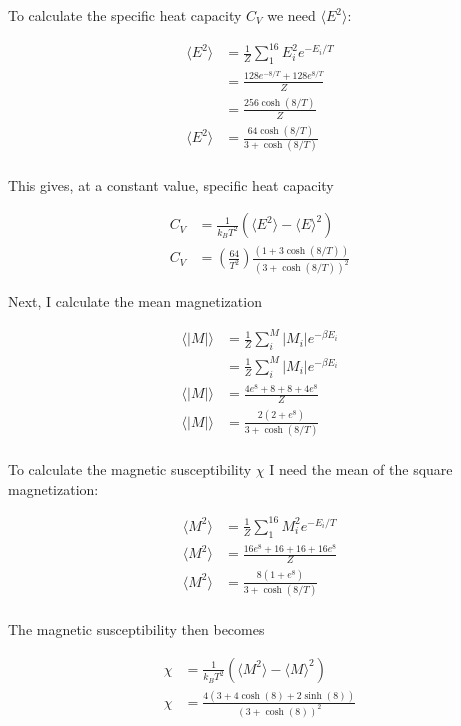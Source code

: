 \documentclass[10pt,showpacs,preprintnumbers,footinbib,amsmath,amssymb,aps,prl,twocolumn,groupedaddress,superscriptaddress,showkeys]{revtex4-1}
\begin{document}
To calculate the specific heat capacity $C_V$ we need $\langle E^2\rangle$: 

\begin{align*}
\langle E^2 \rangle &= \frac{1}{Z}\sum_{1}^{16} E_i^2 e^{-E_i/T}\\
&= \frac{ 128e^{-8/T} + 128e^{8/T}}{Z}\\
 &= \frac{ 256\cosh(8/T)}{Z}\\
\langle E^2 \rangle &= \frac{64\cosh(8/T)}{3+\cosh(8/T)}\\
\end{align*}

This gives, at a constant value, specific heat capacity

\begin{align*}
C_V &= \frac{1}{k_B T^2}(\langle  E^2 \rangle - {\langle  E  \rangle}^2)\\
C_V &= (\frac{64}{T^2})\frac{(1+3\cosh(8/T))}{(3+\cosh(8/T))^2} 
\end{align*}

Next, I calculate the mean magnetization

\begin{align*}
\langle |M| \rangle &= \frac{1}{Z} \sum_{i}^{M} | M_i | e^{-\beta E_i}\\
&= \frac{1}{Z} \sum_{i}^{M} | M_i | e^{-\beta E_i}\\
\langle |M| \rangle &= \frac{4e^{8}+8+8+4e^{8}}{Z}\\
\langle |M| \rangle &= \frac{2(2+e^{8})}{3+\cosh(8/T)}\\
\end{align*}

To calculate the magnetic susceptibility $\chi$ I need the mean of the square magnetization:

\begin{align*}
\langle M^2 \rangle &= \frac{1}{Z} \sum_{1}^{16} M_i^2 e^{-E_i/T}\\
\langle M^2 \rangle &= \frac{16e^{8}+16+16+16e^{8}}{Z}\\
\langle M^2 \rangle &= \frac{8(1+e^{8})}{3+\cosh(8/T)}\\
\end{align*}

The magnetic susceptibility then becomes

\begin{align*}
\chi &= \frac{1}{k_B T^2}(\langle  M^2 \rangle - {\langle  M  \rangle}^2)\\
\chi &= \frac{4 (3 + 4 \cosh(8) + 2 \sinh(8))}{(3 + \cosh(8))^2}
\end{align*}
\end{document}
